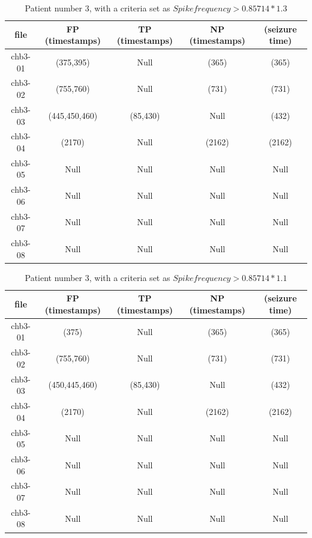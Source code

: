 \begin{table}[H]
\centering
    \begin{tabular}{c | c |c |c | c}
        \hline
         file &  FP (timestamps) & TP (timestamps) & NP (timestamps) & (seizure time)  \\
        \hline
        chb3-01 & (375,395) & Null & (365) & (365)  \\
        chb3-02 & (755,760) & Null & (731) & (731) \\
        chb3-03 & (445,450,460) & (85,430) & Null & (432)  \\
        chb3-04	& (2170) & Null & (2162) & (2162)\\
        chb3-05 & Null & Null & Null & Null\\
        chb3-06 & Null & Null & Null & Null\\
        chb3-07 &  Null & Null & Null & Null  \\
        chb3-08 &  Null & Null & Null & Null  \\
        \hline
     \end{tabular} 
\caption{Patient number 3, with a criteria set as $Spike frequency > 0.85714*1.3$ }
\label{Freq5}
\end{table}

\begin{table}[H]
\centering
    \begin{tabular}{c | c |c |c | c}
        \hline
         file &  FP (timestamps) & TP (timestamps) & NP (timestamps) & (seizure time)  \\
        \hline
        chb3-01 & (375) & Null & (365) & (365)  \\
        chb3-02 & (755,760) & Null & (731) & (731) \\
        chb3-03 & (450,445,460) & (85,430) & Null & (432)  \\
        chb3-04	& (2170) & Null & (2162) & (2162)\\
        chb3-05 & Null & Null & Null & Null\\
        chb3-06 & Null & Null & Null & Null\\
        chb3-07 &  Null & Null & Null & Null  \\
        chb3-08 &  Null & Null & Null & Null  \\
        \hline
     \end{tabular} 
\caption{Patient number 3, with a criteria set as $Spike frequency > 0.85714*1.1$ }
\label{Freq6}
\end{table}



